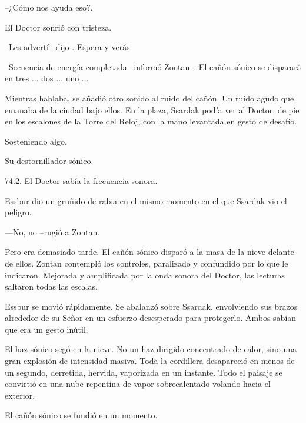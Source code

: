 --¿Cómo nos ayuda eso?.



El Doctor sonrió con tristeza.


--Les advertí --dijo-. Espera y verás.



\mbox{}



--Secuencia de energía completada --informó Zontan--. El cañón sónico se disparará en tres ... dos ... uno ...



Mientras hablaba, se añadió otro sonido al ruido del cañón. Un ruido agudo que emanaba de la ciudad bajo ellos. En la plaza, Ssardak podía ver al Doctor, de pie en los escalones de la Torre del Reloj, con la mano levantada en gesto de desafío.



Sosteniendo algo.



Su destornillador sónico.



74.2. El Doctor sabía la frecuencia sonora.



Essbur dio un gruñido de rabia en el mismo momento en el que Ssardak vio el peligro.



—No, no --rugió a Zontan.



Pero era demasiado tarde. El cañón sónico disparó a la masa de la nieve delante de ellos. Zontan contempló los controles, paralizado y confundido por lo que le indicaron. Mejorada y amplificada por la onda sonora del Doctor, las lecturas saltaron todas las escalas.



Essbur se movió rápidamente. Se abalanzó sobre Ssardak, envolviendo sus brazos alrededor de su Señor en un esfuerzo desesperado para protegerlo. Ambos sabían que era un gesto inútil.



El haz sónico segó en la nieve. No un haz dirigido concentrado de calor, sino una gran explosión de intensidad masiva. Toda la cordillera desapareció en menos de un segundo, derretida, hervida, vaporizada en un instante. Todo el paisaje se convirtió en una nube repentina de vapor sobrecalentado volando hacia el exterior.



El cañón sónico se fundió en un momento.



